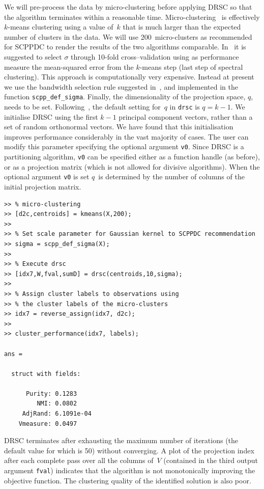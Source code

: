 \documentclass{book}
\begin{document}
We will pre-process the data by micro-clustering before applying DRSC so that
the algorithm terminates within a reasonable time.
%
Micro-clustering~\cite{Zhang1996} is effectively $k$-means clustering using
a value of~$k$ that is much larger than the expected number of clusters in
the data.
%
%
We will use 200~micro-clusters as recommended for SCPPDC to render the results
of the two algorithms comparable.
%
In~\cite{NiuDJ2011} it
is suggested to select $\sigma$ through 10-fold cross--validation using as
performance measure the mean-squared error from the $k$-means step (last step of
spectral clustering).
%
This approach is computationally very expensive. Instead at present we use
the bandwidth selection rule suggested in~\cite{HofmeyrPE2018}, and implemented
in the function {\tt scpp\_def\_sigma}.
%
Finally, the dimensionality of the projection space, $q$, needs to be set.
Following~\cite{NiuDJ2011}, the default setting for~$q$ in {\tt drsc} is
$q=k-1$. We initialise DRSC using the first $k-1$ principal component vectors,
rather than a set of random orthonormal vectors.
We have found that this initialisation improves performance considerably
in the vast majority of cases.
%
The user can modify this parameter specifying the optional argument {\tt v0}. Since
DRSC is a partitioning algorithm, {\tt v0} can be specified either as a function
handle (as before), or as a projection matrix (which is not allowed for
divisive algorithms).
%
When the optional argument {\tt v0} is set $q$~is determined by the
number of columns of the initial projection matrix.

\begin{verbatim}
>> % micro-clustering
>> [d2c,centroids] = kmeans(X,200); 
>>
>> % Set scale parameter for Gaussian kernel to SCPPDC recommendation
>> sigma = scpp_def_sigma(X);
>> 
>> % Execute drsc
>> [idx7,W,fval,sumD] = drsc(centroids,10,sigma);
>>
>> % Assign cluster labels to observations using
>> % the cluster labels of the micro-clusters
>> idx7 = reverse_assign(idx7, d2c);
>>
>> cluster_performance(idx7, labels);

ans = 

  struct with fields:

      Purity: 0.1283
         NMI: 0.0802
     AdjRand: 6.1091e-04
    Vmeasure: 0.0497

\end{verbatim}

\noindent
%
DRSC terminates after exhausting the maximum number of iterations (the default
value for which is 50) without converging. A plot of the projection index after
each complete pass over all the columns of~$V$ (contained in the third
output argument {\tt fval}) indicates that the algorithm is not monotonically
improving the objective function.
%
The clustering quality of the identified solution is also poor.
\end{document}
